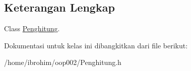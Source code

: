 \subsection{Keterangan Lengkap}
Class \hyperlink{classPenghitung}{Penghitung}. 

Dokumentasi untuk kelas ini dibangkitkan dari file berikut\+:\begin{DoxyCompactItemize}
\item 
/home/ibrohim/oop002/Penghitung.\+h\end{DoxyCompactItemize}
